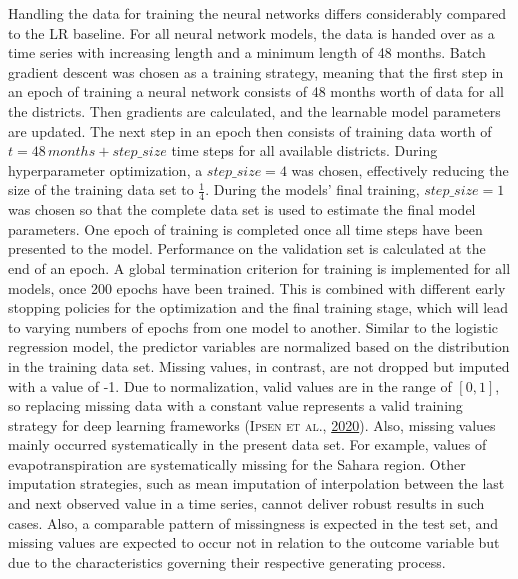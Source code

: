 \documentclass[a4paper,11pt]{article}
\begin{document}
Handling the data for training the neural networks differs considerably compared
to the LR baseline. For all neural network models, the data
is handed over as a time series with increasing length and a minimum length of 48 months.
Batch gradient descent was chosen as a training strategy, meaning that the first
step in an epoch of training a neural network consists of 48 months worth of data
for all the districts. Then gradients are calculated, and the learnable
model parameters are updated. The next step in an epoch then consists of
training data worth of \(t = 48\, months + step\_size\) time steps for all available
districts. During hyperparameter optimization, a \(step\_size = 4\) was chosen,
effectively reducing the size of the training data set to \(\frac{1}{4}\). During the
models' final training, \(step\_size=1\) was chosen so that the complete
data set is used to estimate the final model parameters. One epoch of
training is completed once all time steps have been presented to the model.
Performance on the validation set is calculated at the end of an epoch. A global
termination criterion for training is implemented for all models, once 200
epochs have been trained. This is combined with different early stopping
policies for the optimization and the final training stage, which
will lead to varying numbers of epochs from one model to another.
Similar to the logistic regression model, the predictor variables are normalized
based on the distribution in the training data set. Missing values, in contrast,
are not dropped but imputed with a value of -1. Due to normalization, valid values
are in the range of \([0,1]\), so replacing missing data with a constant value
represents a valid training strategy for deep learning frameworks \textsc{(\textnormal{\textsc{Ipsen} \textsc{et al.}}, \textnormal{\protect\hyperlink{ref-ipsen2020}{2020}})}.
Also, missing values mainly occurred systematically in the present data set. For
example, values of evapotranspiration are systematically missing for the Sahara
region. Other imputation strategies, such as mean imputation of interpolation between
the last and next observed value in a time series, cannot deliver robust
results in such cases. Also, a comparable pattern of missingness is expected
in the test set, and missing values are expected to occur not in relation to
the outcome variable but due to the characteristics governing their respective
generating process.
\end{document}
